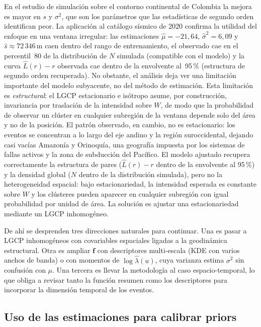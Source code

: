 \documentclass[a4paper,fleqn]{cas-sc}
\numberwithin{equation}{section}
\begin{document}
En el estudio de simulaci\'on sobre el contorno continental de Colombia
la mejora es mayor en $s$ y $\sigma^2$, que son los par\'ametros que
las estad\'isticas de segundo orden identifican peor. La aplicaci\'on
al cat\'alogo s\'ismico de 2020 confirma la utilidad del enfoque en una
ventana irregular: las estimaciones $\hat{\mu}=-21{,}64$,
$\hat{\sigma}^2=6{,}09$ y $\hat{s}\approx 72\,346$\,m caen dentro del
rango de entrenamiento, el observado cae en el percentil~80 de la
distribuci\'on de $N$ simulada (compatible con el modelo) y la curva
$\hat{L}(r)-r$ observada cae dentro de la envolvente al~95\,\%
(estructura de segundo orden recuperada). No obstante, el an\'alisis
deja ver una limitaci\'on importante del modelo subyacente, no del
m\'etodo de estimaci\'on. Esta limitaci\'on es \emph{estructural}: el
LGCP estacionario e is\'otropo asume, por construcci\'on, invariancia
por traslaci\'on de la intensidad sobre $W$, de modo que la
probabilidad de observar un cl\'uster en cualquier subregi\'on de la
ventana depende solo del \'area y no de la posici\'on. El patr\'on observado, en cambio, no es estacionario: los
eventos se concentran a lo largo del eje andino y la regi\'on
suroccidental, dejando casi vac\'ias Amazon\'ia y Orinoqu\'ia, una
geograf\'ia impuesta por los sistemas de fallas activos y la zona de
subducci\'on del Pac\'ifico. El modelo ajustado recupera correctamente
la estructura de pares ($\hat{L}(r)-r$ dentro de la envolvente al
95\,\%) y la densidad global ($N$ dentro de la distribuci\'on
simulada), pero no la heterogeneidad espacial: bajo estacionariedad,
la intensidad esperada es constante sobre $W$ y los cl\'usteres pueden
aparecer en cualquier subregi\'on con igual probabilidad por unidad de
\'area. La solución
es ajustar una estacionariedad mediante un LGCP inhomog\'eneo.

De ah\'i se desprenden tres direcciones naturales para continuar. Una
es pasar a LGCP inhomog\'eneos con covariables espaciales ligadas a la
geodin\'amica estructural. Otra es ampliar $\mathbf{f}$ con descriptores
multi-escala (KDE con varios anchos de banda) o con momentos de
$\log\hat{\lambda}(u)$, cuya varianza estima $\sigma^2$ sin confusi\'on
con $\mu$. Una tercera es llevar la metodolog\'ia al caso
espacio-temporal, lo que obliga a revisar tanto la funci\'on resumen
como los descriptores para incorporar la dimensi\'on temporal de los
eventos.



\subsection{Uso de las estimaciones para calibrar priors}
\label{sec:priors}
\end{document}
